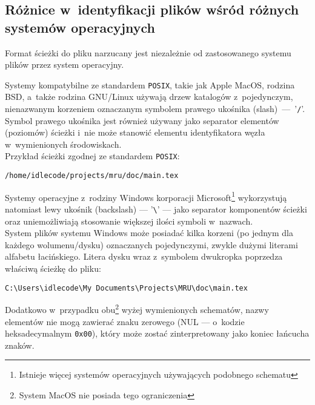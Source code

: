 \subsection{Różnice w~identyfikacji plików wśród różnych systemów operacyjnych}
\par
Format ścieżki do pliku narzucany jest niezależnie od zastosowanego systemu plików przez system operacyjny.

\par
Systemy kompatybilne ze standardem \texttt{POSIX}, takie jak Apple MacOS, rodzina BSD, a~także rodzina GNU/Linux używają drzew katalogów z~pojedynczym, nienazwanym korzeniem oznaczanym symbolem prawego ukośnika (slash)~---~'\texttt{/}'.\\
Symbol prawego ukośnika jest również używany jako separator elementów (poziomów) ścieżki i~nie może stanowić elementu identyfikatora węzła w~wymienionych środowiskach.\\
Przykład ścieżki zgodnej ze standardem \texttt{POSIX}:
\begin{center}
\texttt{/home/idlecode/projects/mru/doc/main.tex}
\end{center}

\par
Systemy operacyjne z~rodziny Windows korporacji Microsoft\footnote{Istnieje  więcej systemów operacyjnych używających podobnego schematu} wykorzystują natomiast lewy ukośnik (backslash) --- '\texttt{\textbackslash}' --- jako separator komponentów ścieżki oraz uniemożliwiają stosowanie większej ilości symboli w~nazwach.\\
System plików systemu Windows może posiadać kilka korzeni (po jednym dla każdego wolumenu/dysku) oznaczanych pojedynczymi, zwykle dużymi literami alfabetu łacińskiego. Litera dysku wraz z~symbolem dwukropka poprzedza właściwą ścieżkę do pliku:\\
\begin{center}
\texttt{C:\textbackslash Users\textbackslash idlecode\textbackslash My Documents\textbackslash Projects\textbackslash MRU\textbackslash doc\textbackslash main.tex}
\end{center}

\par
Dodatkowo w~przypadku obu\footnote{System MacOS nie posiada tego ograniczenia} wyżej wymienionych schematów, nazwy elementów nie mogą zawierać znaku zerowego (NUL --- o~kodzie heksadecymalnym \texttt{0x00}), który może zostać zinterpretowany jako koniec łańcucha znaków.

